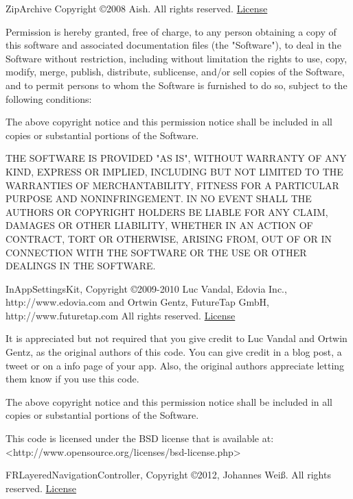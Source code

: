 \documentclass[oneside, openany, 12pt]{tufte-book}
\newcommand{\licensetext}{\scriptsize \setlength{\parskip}{0mm} \singlespacing}
\begin{document}
ZipArchive Copyright \copyright 2008 Aish. All rights reserved. \href{http://www.opensource.org/licenses/mit-license.php}{License}

{\licensetext 
Permission is hereby granted, free of charge, to any person obtaining a copy of this software and associated documentation files (the "Software"), to deal in the Software without restriction, including without limitation the rights to use, copy, modify, merge, publish, distribute, sublicense, and/or sell copies of the Software, and to permit persons to whom the Software is furnished to do so, subject to the following conditions:

The above copyright notice and this permission notice shall be included in all copies or substantial portions of the Software.

THE SOFTWARE IS PROVIDED "AS IS", WITHOUT WARRANTY OF ANY KIND, EXPRESS OR IMPLIED, INCLUDING BUT NOT LIMITED TO THE WARRANTIES OF MERCHANTABILITY, FITNESS FOR A PARTICULAR PURPOSE AND NONINFRINGEMENT. IN NO EVENT SHALL THE AUTHORS OR COPYRIGHT HOLDERS BE LIABLE FOR ANY CLAIM, DAMAGES OR OTHER LIABILITY, WHETHER IN AN ACTION OF CONTRACT, TORT OR OTHERWISE, ARISING FROM, OUT OF OR IN CONNECTION WITH THE SOFTWARE OR THE USE OR OTHER DEALINGS IN THE SOFTWARE.}


InAppSettingsKit, Copyright \copyright 2009-2010 Luc Vandal, Edovia Inc., http://www.edovia.com and Ortwin Gentz, FutureTap GmbH, http://www.futuretap.com All rights reserved. \href{http://www.opensource.org/licenses/bsd-license.php}{License}

{\licensetext It is appreciated but not required that you give credit to Luc Vandal and Ortwin Gentz, as the original authors of this code. You can give credit in a blog post, a tweet or on a info page of your app. Also, the original authors appreciate letting them know if you use this code.

The above copyright notice and this permission notice shall be included in all copies or substantial portions of the Software.

This code is licensed under the BSD license that is available at: <http://www.opensource.org/licenses/bsd-license.php>}

FRLayeredNavigationController, Copyright \copyright 2012, Johannes Wei\ss.  All rights reserved. \href{https://github.com/weissi/FRLayeredNavigationController/blob/master/LICENSE}{License} 
\end{document}
